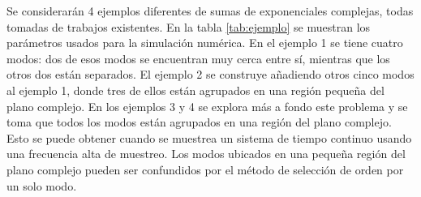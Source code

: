 Se considerarán 4 ejemplos diferentes de sumas de exponenciales complejas, todas tomadas de trabajos existentes. En la tabla \ref{tab:ejemplo} se muestran los parámetros usados para la simulación numérica. En el ejemplo 1 se tiene cuatro modos: dos de esos modos se encuentran muy cerca entre sí, mientras que los otros dos están separados. El ejemplo 2 se construye añadiendo otros cinco modos al ejemplo 1, donde tres de ellos están agrupados en una región pequeña del plano complejo. En los ejemplos 3 y 4 se explora más a fondo este problema y se toma que todos  los modos están agrupados en una región del plano complejo. Esto se puede obtener cuando se muestrea un sistema de tiempo continuo usando una frecuencia alta de muestreo. Los modos ubicados en una pequeña región del plano complejo pueden ser confundidos por el método de selección de orden por un solo modo.  
